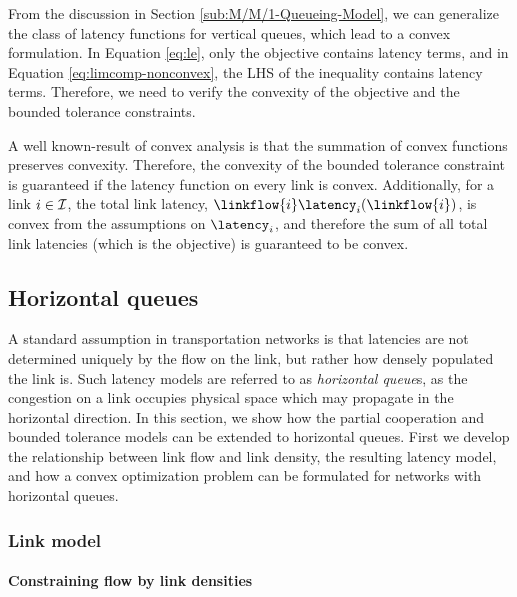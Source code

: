 From the discussion in Section \ref{sub:M/M/1-Queueing-Model}, we
can generalize the class of latency functions for vertical queues,
which lead to a convex formulation. In Equation \eqref{eq:le}, only
the objective contains latency terms, and in Equation \eqref{eq:limcomp-nonconvex},
the LHS of the inequality contains latency terms. Therefore, we need
to verify the convexity of the objective and the bounded tolerance
constraints.

A well known-result of convex analysis is that the summation of convex
functions preserves convexity. Therefore, the convexity of the bounded
tolerance constraint is guaranteed if the latency function on every
link is convex. Additionally, for a link $i\in\mathcal{I}$, the total
link latency, $\linkflow{\link}\latency_{\link}\left(\linkflow{\link}\right)$,
is convex from the assumptions on $\latency_{\link}$, and therefore
the sum of all total link latencies (which is the objective) is guaranteed
to be convex.


\subsection{Horizontal queues\label{sub:Horizontal-Queueing}}

A standard assumption in transportation networks is that latencies
are not determined uniquely by the flow on the link, but rather how
densely populated the link is. Such latency models are referred to
as \emph{horizontal queue}s, as the congestion on a link occupies
physical space which may propagate in the horizontal direction. In
this section, we show how the partial cooperation and bounded tolerance
models can be extended to horizontal queues. First we develop the
relationship between link flow and link density, the resulting latency
model, and how a convex optimization problem can be formulated for
networks with horizontal queues.


\subsubsection{Link model\label{sub:Link-model}}


\paragraph{Constraining flow by link densities}

